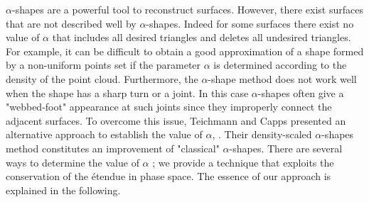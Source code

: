 \indent $\alpha$-shapes are a powerful tool to reconstruct surfaces. However, there exist surfaces that are not described well by $ \alpha $-shapes. Indeed for some surfaces there exist no value of $\alpha$ that includes all desired triangles and deletes all undesired triangles. For example, it can be difficult to obtain a good approximation of a shape formed by a non-uniform points set if the parameter $\alpha$ is determined according to the density of the point cloud. Furthermore, the $\alpha$-shape method does not work well when the shape has a sharp turn or a joint. In this case $\alpha$-shapes often give a "webbed-foot" appearance at such joints since they improperly connect the adjacent surfaces. To overcome this issue, Teichmann and Capps presented an alternative approach to establish the value of $\alpha$, \cite{teichmann1998surface}. Their density-scaled $\alpha$-shapes method constitutes an improvement of "classical" $\alpha$-shapes.
There are several ways to determine the value of $\alpha$ \cite{mandal1997selection}; we provide a technique that exploits the conservation of the \'{e}tendue in phase space. The essence of our approach is explained in the following.

